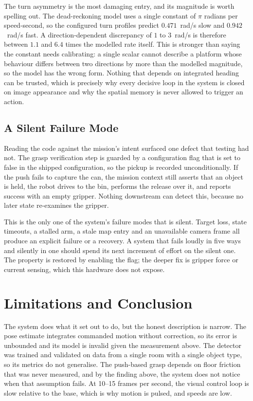 \documentclass[conference,a4paper,10pt]{IEEEtran}
\begin{document}
The turn asymmetry is the most damaging entry, and its magnitude is worth
spelling out. The dead-reckoning model uses a single constant of $\pi$
radians per speed-second, so the configured turn profiles predict
$0.471$~rad/s slow and $0.942$~rad/s fast. A direction-dependent
discrepancy of $1$ to $3$~rad/s is therefore between $1.1$ and $6.4$
times the modelled rate itself. This is stronger than saying the constant
needs calibrating: a single scalar cannot describe a platform whose
behaviour differs between two directions by more than the modelled
magnitude, so the model has the wrong form. Nothing that depends on
integrated heading can be trusted, which is precisely why every decisive
loop in the system is closed on image appearance and why the spatial
memory is never allowed to trigger an action.

\subsection{A Silent Failure Mode}

Reading the code against the mission's intent surfaced one defect that
testing had not. The grasp verification step is guarded by a
configuration flag that is set to false in the shipped configuration,
so the pickup is recorded unconditionally. If the push fails to capture
the can, the mission context still asserts that an object is held, the
robot drives to the bin, performs the release over it, and reports
success with an empty gripper. Nothing downstream can detect this,
because no later state re-examines the gripper.

This is the only one of the system's failure modes that is silent. Target
loss, state timeouts, a stalled arm, a stale map entry and an
unavailable camera frame all produce an explicit failure or a recovery.
A system that fails loudly in five ways and silently in one should spend
its next increment of effort on the silent one. The property is restored
by enabling the flag; the deeper fix is gripper force or current sensing,
which this hardware does not expose.

\section{Limitations and Conclusion}

The system does what it set out to do, but the honest description is
narrow. The pose estimate integrates commanded motion without correction,
so its error is unbounded and its model is invalid given the measurement
above. The detector was trained and validated on data from a single room
with a single object type, so its metrics do not generalise. The
push-based grasp depends on floor friction that was never measured, and
by the finding above, the system does not notice when that assumption
fails. At 10--15 frames per second, the visual control loop is slow
relative to the base, which is why motion is pulsed, and speeds are low.
\end{document}
